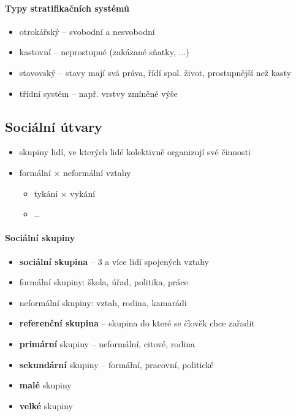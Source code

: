 \paragraph{Typy stratifikačních systémů}
\begin{itemize}
\item otrokářský -- svobodní a nesvobodní
\item kastovní -- neprostupné (zakázané sňatky, ...)
\item stavovský -- stavy mají svá práva, řídí spol. život, prostupnější než kasty
\item třídní systém -- 	např. vrstvy zmíněné výše
\end{itemize}

\subsection{Sociální útvary}
\begin{itemize}
\item skupiny lidí, ve kterých lidé kolektivně organizují své činnosti
\item formální $\times$ neformální vztahy
	\begin{itemize}
	\item tykání $\times$ vykání
	\item \ldots
	\end{itemize}

\end{itemize}

\paragraph{Sociální skupiny}
\begin{itemize}
\item \textbf{sociální skupina} -- 3 a více lidí spojených vztahy
\item formální skupiny: škola, úřad, politika, práce
\item neformální skupiny: vztah, rodina, kamarádi
\item \textbf{referenční skupina} -- skupina do které se člověk chce zařadit	
\item \textbf{primární} skupiny -- neformální, citové, rodina
\item \textbf{sekundární} skupiny -- formální, pracovní, politické
\item \textbf{malé} skupiny
\item \textbf{velké} skupiny
\end{itemize}


